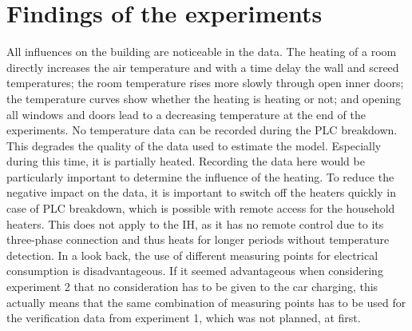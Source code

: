 \section{Findings of the experiments}
\label{sec:findings of the experiments}
All influences on the building are noticeable in the data. The heating of a room directly increases the air temperature and with a time delay the wall and screed temperatures; the room temperature rises more slowly through open inner doors; the temperature curves show whether the heating is heating or not; and opening all windows and doors lead to a decreasing temperature at the end of the experiments. \newline
No temperature data can be recorded during the PLC breakdown. This degrades the quality of the data used to estimate the model. Especially during this time, it is partially heated. Recording the data here would be particularly important to determine the influence of the heating. To reduce the negative impact on the data, it is important to switch off the heaters quickly in case of PLC breakdown, which is possible with remote access for the household heaters. This does not apply to the IH, as it has no remote control due to its three-phase connection and thus heats for longer periods without temperature detection.\newline
In a look back, the use of different measuring points for electrical consumption is disadvantageous. If it seemed advantageous when considering experiment 2 that no consideration has to be given to the car charging, this actually means that the same combination of measuring points has to be used for the verification data from experiment 1, which was not planned, at first.\newline

